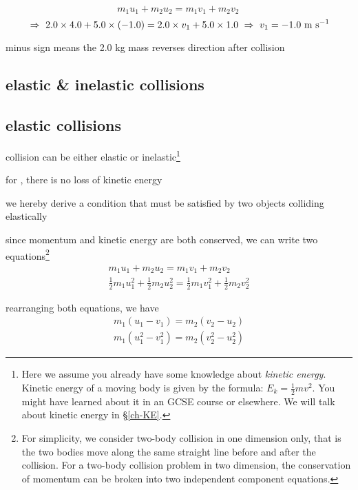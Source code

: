 \begin{soln}\begin{equation*}
m_1 u_1 + m_2 u_2 = m_1 v_1 + m_2 v_2 \, 
\end{equation*}
\begin{equation*}
\, \Rightarrow \, \, 2.0\times4.0+5.0\times(-1.0) = 2.0 \times v_1 + 5.0\times1.0 \, \, \Rightarrow \, \,  v_1 = -1.0 \text{ m s$^{-1}$}
\end{equation*}

minus sign means the 2.0 kg mass reverses direction after collision \end{soln}

\subsection{elastic \& inelastic collisions}

\subsection*{elastic collisions}

collision can be either elastic or inelastic\footnote{Here we assume you already have some knowledge about \emph{kinetic energy}. Kinetic energy of a moving body is given by the formula: $E_k = \frac{1}{2}mv^2$. You might have learned about it in an GCSE course or elsewhere. We will talk about kinetic energy in \S\ref{ch-KE}.}

\begin{ilight}
	for , there is no loss of kinetic energy
\end{ilight}



we hereby derive a condition that must be satisfied by two objects colliding elastically

since momentum and kinetic energy are both conserved, we can write two equations\footnote{For simplicity, we consider two-body collision in one dimension only, that is the two bodies move along the same straight line before and after the collision. For a two-body collision problem in two dimension, the conservation of momentum can be broken into two independent component equations.}
\begin{gather*}
	{ m_1 u_1 + m_2 u_2 = m_1 v_1 + m_2 v_2 }\\
	{ \frac{1}{2}m_1 u_1^2 + \frac{1}{2}m_2 u_2^2 = \frac{1}{2}m_1 v_1^2 + \frac{1}{2}m_2 v_2^2  }
\end{gather*}

rearranging both equations, we have
\begin{gather}
m_1 (u_1 - v_1) = m_2 (v_2 - u_2) \tag{1}\\
m_1 (u_1^2 - v_1^2) = m_2 (v_2^2 - u_2^2)  \tag{2}
\end{gather}


